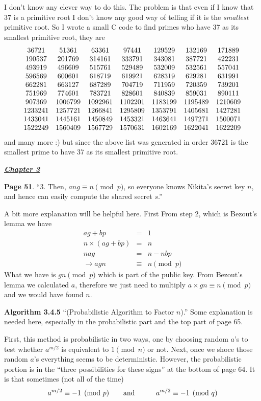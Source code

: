 \documentclass[aps,preprint,preprintnumbers,nofootinbib,showpacs,prd]{revtex4-1}
\newcommand{\ba}{\begin{array}}
\newcommand{\ea}{\end{array}}
\newcommand{\nbea}{\begin{eqnarray*}}
\newcommand{\neea}{\end{eqnarray*}}
\begin{document}
I don't know any clever way to do this. The problem is that even if I know that 37 is a primitive root I don't know any good way of telling if it is the {\it smallest} primitive root. So I wrote a small C code to find primes who have 37 as its smallest primitive root, they are
%
\nbea
\ba{c c c c c c c}
36721 & 51361 & 63361 & 97441 & 129529 & 132169 & 171889 \\
190537 & 201769 & 314161 & 333791 & 343081 & 387721 & 422231 \\
493919 & 496609 & 515761 & 529489 & 532009 & 532561 & 557041 \\
596569 & 600601 & 618719 & 619921 & 628319 & 629281 & 631991 \\
662281 & 663127 & 687289 & 704719 & 711959 & 720359 & 739201 \\
751969 & 774601 & 783721 & 828601 & 840839 & 859031 & 890111 \\
907369 & 1006799 & 1092961 & 1102201 & 1183199 & 1195489 & 1210609 \\
1233241 & 1257721 & 1266841 & 1295809 & 1353791 & 1405681 & 1427281 \\
1433041 & 1445161 & 1450849 & 1453321 & 1463641 & 1497271 & 1500071 \\
1522249 & 1560409 & 1567729 & 1570631 & 1602169 & 1622041 & 1622209
\ea
\neea
%
and many more :) but since the above list was generated in order 36721 is the smallest prime to have 37 as its smallest primitive root.

\bigskip
\underline{\textbf{\textit{Chapter 3}}}
\bigskip

{\bf Page 51}. ``3. Then, $ang \equiv n \pmod{p}$, so everyone knows Nikita's secret key $n$,
and hence can easily compute the shared secret $s$.''

A bit more explanation will be helpful here. First From step 2, which is Bezout's lemma we have
%
\nbea
ag + bp & = & 1 \\
n \times (ag + bp) & = & n \\
nag & = & n - nbp \\
\to agn & \equiv & n \pmod{p}
\neea
%
What we have is $gn \pmod{p}$ which is part of the public key. From Bezout's lemma we calculated $a$, therefore we just need to multiply $a \times gn \equiv n \pmod{p}$ and we would have found $n$.

{\bf Algorithm 3.4.5} ``(Probabilistic Algorithm to Factor $n$).'' Some explanation is needed here, especially in the probabilistic part and the top part of page 65.

First, this method is probabilistic in two ways, one by choosing random $a$'s to test whether $a^{m/2}$ is equivalent to $1 \pmod{n}$ or not. Next, once we shoce those random $a$'s everything seems to be deterministic. However, the probabilistic portion is in the ``three possibilities for these signs'' at the bottom of page 64. It is that sometimes (not all of the time) 
%
\nbea
a^{m/2} \equiv -1 \pmod{p} &~~~~~~{\rm and}~~~~~~& a^{m/2} \equiv -1 \pmod{q}
\neea
%
\end{document}

